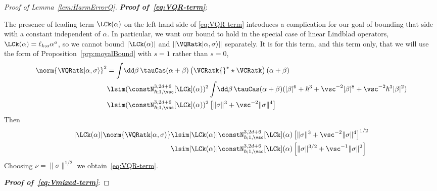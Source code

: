 \documentclass{article}
\numberwithin{equation}{section}
\begin{document}
\begin{proof}[Proof of Lemma~\ref{lem:HarmErrorQ}]
	\noindent\textit{\textbf{Proof of~\eqref{eq:VQR-term}}}:
	
	The presence of leading term $\LCk(\alpha)$ on the left-hand side of \eqref{eq:VQR-term} introduces a complication for our goal of bounding that side with a constant independent of $\alpha$.  In particular, we want our bound to hold in the special case of linear Lindblad operators, $\LCk(\alpha) = \ell_{k; a} \alpha^a$, so we cannot bound $|\LCk(\alpha)|$ and $\| \VQRatk|\alpha,\sigma \rangle \|$ separately.  It is for this term, and this term only, that we will use the form of Proposition~\ref{prp:moyalBound} with $s=1$ rather than $s=0$,
	\begin{align}
		\norm{\VQRatk|\alpha,\sigma \rangle }^2
		&= \int \!\dd \beta\, \tauCas(\alpha+\beta)\left(\VCRatk{}^* \star \VCRatk\right)(\alpha+\beta)\\
		& \lsim     
		(\constN^{3,2d+6}_{\hbar;1,\vsc}[\LCk] (\alpha))^2 \int \!\dd \beta\, \tauCas(\alpha+\beta)  (|\beta|^{6} + \hbar^{3} + \vsc^{-2}|\beta|^{8} + \vsc^{-2}\hbar^3|\beta|^{2})
		\\
		& \lsim      
		(\constN^{3,2d+6}_{\hbar;1,\vsc}[\LCk] (\alpha))^2 \left[
  \|\sigma\|^3 + \vsc^{-2} \|\sigma\|^4
		\right]
	\end{align}
    Then
    \begin{align}
        |\LCk(\alpha)|\norm{\VQRatk|\alpha,\sigma \rangle }
        &\lsim |\LCk(\alpha)| \constN^{3,2d+6}_{\hbar;1,\vsc}[\LCk] (\alpha)
        \left[\|\sigma\|^3 + \vsc^{-2} \|\sigma\|^4
		\right]^{1/2}
        \\
        &\lsim |\LCk(\alpha)| \constN^{3,2d+6}_{\hbar;1,\vsc}[\LCk] (\alpha) 
        \left[ \|\sigma\|^{3/2} + \vsc^{-1}\|\sigma\|^2\right]
    \end{align}
    Choosing $\nu=\|\sigma\|^{1/2}$ we
    obtain~\eqref{eq:VQR-term}.
	
	\noindent\textit{\textbf{Proof of~\eqref{eq:Vmixed-term}}}:
	

\end{proof}
\end{document}

